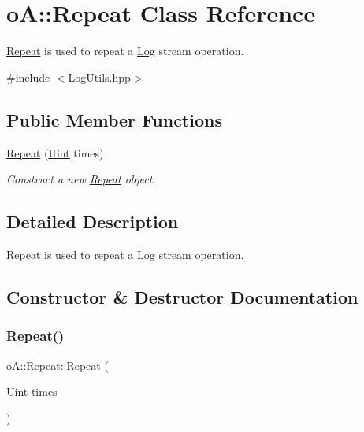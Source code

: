 \hypertarget{classo_a_1_1_repeat}{}\section{oA\+:\+:Repeat Class Reference}
\label{classo_a_1_1_repeat}


\mbox{\hyperlink{classo_a_1_1_repeat}{Repeat}} is used to repeat a \mbox{\hyperlink{classo_a_1_1_log}{Log}} stream operation.  




{\ttfamily \#include $<$Log\+Utils.\+hpp$>$}

\subsection*{Public Member Functions}
\begin{DoxyCompactItemize}
\item 
\mbox{\hyperlink{classo_a_1_1_repeat_acced7bf3a3daff1434569dc593e2de0e}{Repeat}} (\mbox{\hyperlink{namespaceo_a_abe1d8250226c5cf34f84d7b75fc7922e}{Uint}} times)
\begin{DoxyCompactList}\small\item\em Construct a new \mbox{\hyperlink{classo_a_1_1_repeat}{Repeat}} object. \end{DoxyCompactList}\end{DoxyCompactItemize}


\subsection{Detailed Description}
\mbox{\hyperlink{classo_a_1_1_repeat}{Repeat}} is used to repeat a \mbox{\hyperlink{classo_a_1_1_log}{Log}} stream operation. 

\subsection{Constructor \& Destructor Documentation}
\mbox{\label{classo_a_1_1_repeat_acced7bf3a3daff1434569dc593e2de0e}} 
\subsubsection{\texorpdfstring{Repeat()}{Repeat()}}
{\footnotesize\ttfamily o\+A\+::\+Repeat\+::\+Repeat (\begin{DoxyParamCaption}\item[{\mbox{\hyperlink{namespaceo_a_abe1d8250226c5cf34f84d7b75fc7922e}{Uint}}}]{times }\end{DoxyParamCaption})\hspace{0.3cm}{\ttfamily [inline]}}



